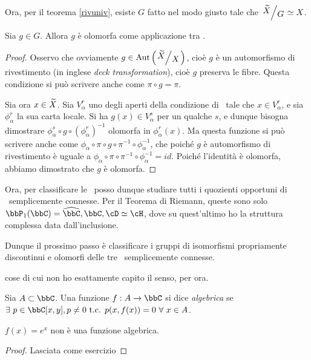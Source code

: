 Ora, per il teorema \ref{rivuniv}, esiste $G$ fatto nel modo giusto tale che $\quotient{\ot X}{G}\isom X$.
\begin{lemma}
 	Sia $g\in G$. Allora $g$ è olomorfa come applicazione tra \sdR.
\end{lemma}
\begin{proof}
 	Osservo che ovviamente $g \in \mbox{Aut}\left(\quotient{\ot X}{X}\right)$, cioè $g$ è un automorfismo di rivestimento (in inglese \emph{deck transformation}), cioè $g$ preserva le fibre. Questa condizione si può scrivere anche come $\pi\circ g=\pi$.
 	
 	Sia ora $x\in \widetilde{X}$. Sia $V_\alpha^r$ uno degli aperti della condizione di \sdR\ tale che $x\in V_\alpha^r$, e sia $\phi_\alpha^r$ la sua carta locale. Si ha $g(x)\in V_\alpha^s$ per un qualche $s$, e dunque bisogna dimostrare $\phi_\alpha^s\circ g\circ (\phi_\alpha^r)^{-1}$ olomorfa in $\phi_\alpha^r(x)$. Ma questa funzione si può scrivere anche come $\phi_\alpha\circ\pi\circ g\circ \pi^{-1}\circ \phi_\alpha^{-1}$, che poiché $g$ è automorfismo di rivestimento è uguale a $\phi_\alpha\circ\pi\circ\pi^{-1}\circ\phi_\alpha^{-1}=id$. Poiché l'identità è olomorfa, abbiamo dimostrato che $g$ è olomorfa.
\end{proof}

Ora, per classificare le \sdR\ posso dunque studiare tutti i quozienti opportuni di \sdR\ semplicemente connesse. Per il Teorema di Riemann, queste sono solo $\bbP_1(\bbC)=\oc \bbC, \bbC, \cD\isom\cH$, dove su quest'ultimo ho la struttura complessa data dall'inclusione.

Dunque il prossimo passo è classificare i gruppi di isomorfismi propriamente discontinui e olomorfi delle tre \sdR\ semplicemente connesse.

 cose di cui non ho esattamente capito il senso, per ora.

\begin{definizione}
	Sia $A\subset\bbC$. Una funzione $f:A\rar\bbC$ si dice \emph{algebrica} se $\exists\ p\in\bbC[x,y], p\neq0 \tc p(x,f(x))=0\ \forall\ x\in A$.
\end{definizione}
\begin{lemma}
 	$f(x)=e^x$ non è una funzione algebrica.
\end{lemma}
\begin{proof}
 	Lasciata come esercizio
\end{proof}

